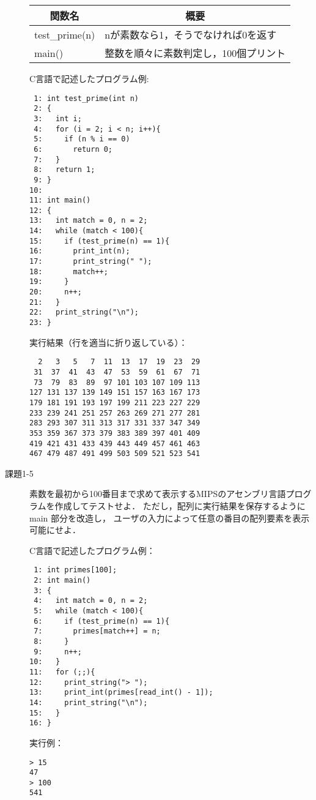\documentclass[a4j,11pt]{jarticle}
\begin{document}
\begin{description}
  \begin{table}[h]
    \begin{tabular}{|l|l|}
      \hline
      \multicolumn{1}{|c|}{関数名} & \multicolumn{1}{c|}{概要} \\ \hline
      test\_prime(n)            & nが素数なら1，そうでなければ0を返す     \\ \hline
      main()                    & 整数を順々に素数判定し，100個プリント    \\ \hline
    \end{tabular}
  \end{table}
C言語で記述したプログラム例: 
\begin{verbatim}
 1: int test_prime(int n)
 2: {
 3:   int i;
 4:   for (i = 2; i < n; i++){
 5:     if (n % i == 0)
 6:       return 0;
 7:   }
 8:   return 1;
 9: }
10: 
11: int main()
12: {
13:   int match = 0, n = 2;
14:   while (match < 100){
15:     if (test_prime(n) == 1){
16:       print_int(n);
17:       print_string(" ");
18:       match++;
19:     }
20:     n++;
21:   }
22:   print_string("\n");
23: }
\end{verbatim}
実行結果（行を適当に折り返している）：
\begin{verbatim}
  2   3   5   7  11  13  17  19  23  29
 31  37  41  43  47  53  59  61  67  71
 73  79  83  89  97 101 103 107 109 113
127 131 137 139 149 151 157 163 167 173
179 181 191 193 197 199 211 223 227 229
233 239 241 251 257 263 269 271 277 281
283 293 307 311 313 317 331 337 347 349
353 359 367 373 379 383 389 397 401 409
419 421 431 433 439 443 449 457 461 463
467 479 487 491 499 503 509 521 523 541
\end{verbatim}

\item[課題1-5]素数を最初から100番目まで求めて表示するMIPSのアセンブリ言語プログラムを作成してテストせよ． ただし，配列に実行結果を保存するように main 部分を改造し， ユーザの入力によって任意の番目の配列要素を表示可能にせよ． 

C言語で記述したプログラム例：
\begin{verbatim}
 1: int primes[100];
 2: int main()
 3: {
 4:   int match = 0, n = 2;
 5:   while (match < 100){
 6:     if (test_prime(n) == 1){
 7:       primes[match++] = n;
 8:     }
 9:     n++;
10:   }
11:   for (;;){
12:     print_string("> ");
13:     print_int(primes[read_int() - 1]);
14:     print_string("\n");
15:   }
16: }
\end{verbatim}
実行例：
\begin{verbatim}
> 15
47
> 100
541
\end{verbatim}
\end{description}
\end{document}

